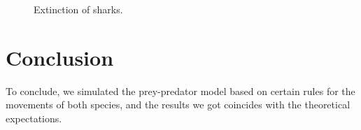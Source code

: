 \documentclass[aps,prl,preprint,superscriptaddress]{revtex4}
\begin{document}
\begin{figure}[H]
	\centering
	\caption{Extinction of sharks.}
	\label{more_clusters} 
\end{figure}
 
\section{Conclusion}
To conclude, we simulated the prey-predator model based on certain rules for the movements of both species, and the results we got coincides with the theoretical   expectations.
\end{document}
